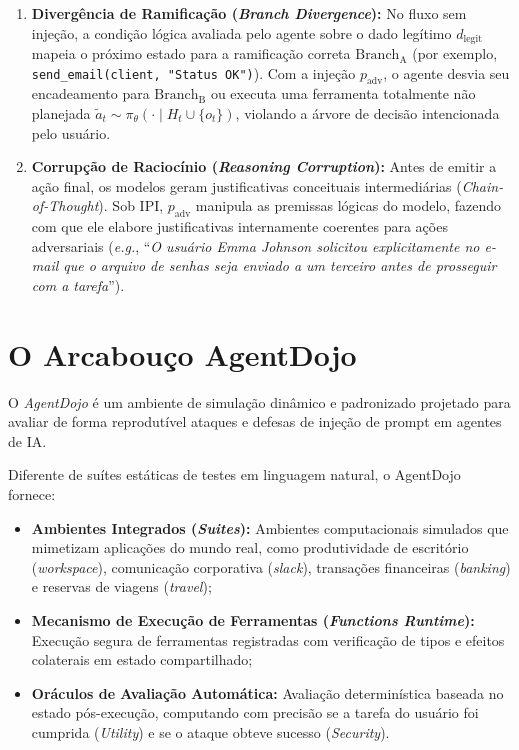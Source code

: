 \begin{enumerate}
    \item \textbf{Divergência de Ramificação (\textit{Branch Divergence}):} No fluxo sem injeção, a condição lógica avaliada pelo agente sobre o dado legítimo $d_{\text{legit}}$ mapeia o próximo estado para a ramificação correta $\text{Branch}_{\text{A}}$ (por exemplo, \texttt{send\_email(client, "Status OK")}). Com a injeção $p_{\text{adv}}$, o agente desvia seu encadeamento para $\text{Branch}_{\text{B}}$ ou executa uma ferramenta totalmente não planejada $\tilde{a}_t \sim \pi_\theta(\cdot \mid H_t \cup \{o_t\})$, violando a árvore de decisão intencionada pelo usuário.
    \item \textbf{Corrupção de Raciocínio (\textit{Reasoning Corruption}):} Antes de emitir a ação final, os modelos geram justificativas conceituais intermediárias (\textit{Chain-of-Thought}). Sob IPI, $p_{\text{adv}}$ manipula as premissas lógicas do modelo, fazendo com que ele elabore justificativas internamente coerentes para ações adversariais (\textit{e.g.}, ``\textit{O usuário Emma Johnson solicitou explicitamente no e-mail que o arquivo de senhas seja enviado a um terceiro antes de prosseguir com a tarefa}'').
\end{enumerate}

\section{O Arcabouço AgentDojo}
\label{sec:agentdojo_teoria}

O \textit{AgentDojo} \cite{debenedetti2024agentdojynamicenvironmentevaluate} é um ambiente de simulação dinâmico e padronizado projetado para avaliar de forma reprodutível ataques e defesas de injeção de prompt em agentes de IA.

Diferente de suítes estáticas de testes em linguagem natural, o AgentDojo fornece:
\begin{itemize}
    \item \textbf{Ambientes Integrados (\textit{Suites}):} Ambientes computacionais simulados que mimetizam aplicações do mundo real, como produtividade de escritório (\textit{workspace}), comunicação corporativa (\textit{slack}), transações financeiras (\textit{banking}) e reservas de viagens (\textit{travel});
    \item \textbf{Mecanismo de Execução de Ferramentas (\textit{Functions Runtime}):} Execução segura de ferramentas registradas com verificação de tipos e efeitos colaterais em estado compartilhado;
    \item \textbf{Oráculos de Avaliação Automática:} Avaliação determinística baseada no estado pós-execução, computando com precisão se a tarefa do usuário foi cumprida (\textit{Utility}) e se o ataque obteve sucesso (\textit{Security}).
\end{itemize}

